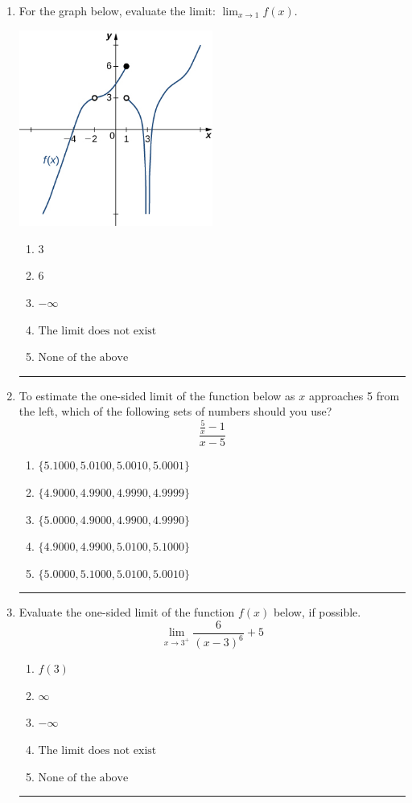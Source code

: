 \documentclass[14pt]{extbook}
\newcommand{\litem}[1]{\item#1\hspace*{-1cm}\rule{\textwidth}{0.4pt}}
\begin{document}
\begin{enumerate}
{\begin{enumerate}[label=\Alph*.]
\end{enumerate} }
\litem{
For the graph below, evaluate the limit: $ \displaystyle \lim_{x \rightarrow 1} f(x)$.
\begin{center}
    \includegraphics[width=0.5\textwidth]{../Figures/evaluateLimitGraphicallyC.png}
\end{center}
\begin{enumerate}[label=\Alph*.]
\item \( 3 \)
\item \( 6 \)
\item \( -\infty \)
\item \( \text{The limit does not exist} \)
\item \( \text{None of the above} \)

\end{enumerate} }
\litem{
To estimate the one-sided limit of the function below as $x$ approaches 5 from the left, which of the following sets of numbers should you use?\[ \frac{\frac{5}{x} - 1}{x - 5} \]\begin{enumerate}[label=\Alph*.]
\item \( \{ 5.1000, 5.0100, 5.0010, 5.0001 \} \)
\item \( \{ 4.9000, 4.9900, 4.9990, 4.9999 \} \)
\item \( \{ 5.0000, 4.9000, 4.9900, 4.9990 \} \)
\item \( \{ 4.9000, 4.9900, 5.0100, 5.1000 \} \)
\item \( \{ 5.0000, 5.1000, 5.0100, 5.0010 \} \)

\end{enumerate} }
\litem{
Evaluate the one-sided limit of the function $f(x)$ below, if possible.\[ \lim_{x \rightarrow 3^+} \frac{6}{(x-3)^6}+5 \]\begin{enumerate}[label=\Alph*.]
\item \( f(3) \)
\item \( \infty \)
\item \( -\infty \)
\item \( \text{The limit does not exist} \)
\item \( \text{None of the above} \)

\end{enumerate} }
\end{enumerate}
\end{document}
